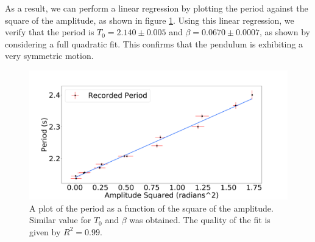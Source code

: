 \documentclass[%
 reprint,
 amsmath,amssymb
 aps,
]{revtex4-2}
\begin{document}
As a result, we can perform a linear regression by plotting the period against the square of the amplitude, as shown in figure \ref{fig:period-vs-amplitude-linear}. Using this linear regression, we verify that the period is $T_0=2.140 \pm 0.005$ and $\beta = 0.0670 \pm 0.0007$, as shown by considering a full quadratic fit. This confirms that the pendulum is exhibiting a very symmetric motion.
\begin{figure}[!h]
    \includegraphics[width=\linewidth]{Figures/period-vs-amplitude-linear.png}

    \caption{A plot of the period as a function of the square of the amplitude. Similar value for $T_0$ and $\beta$ was obtained. The quality of the fit is given by $R^2=0.99$.}
    \label{fig:period-vs-amplitude-linear}
\end{figure}
\end{document}
